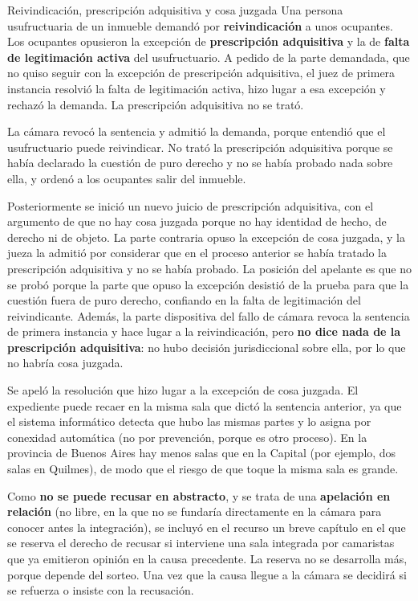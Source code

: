 \documentclass[12pt,oneside]{book}
\begin{document}
\begin{example}{Reivindicación, prescripción adquisitiva y cosa juzgada}
Una persona usufructuaria de un inmueble demandó por \textbf{reivindicación} a unos ocupantes. Los ocupantes opusieron la excepción de \textbf{prescripción adquisitiva} y la de \textbf{falta de legitimación activa} del usufructuario. A pedido de la parte demandada, que no quiso seguir con la excepción de prescripción adquisitiva, el juez de primera instancia resolvió la falta de legitimación activa, hizo lugar a esa excepción y rechazó la demanda. La prescripción adquisitiva no se trató.

La cámara revocó la sentencia y admitió la demanda, porque entendió que el usufructuario puede reivindicar. No trató la prescripción adquisitiva porque se había declarado la cuestión de puro derecho y no se había probado nada sobre ella, y ordenó a los ocupantes salir del inmueble.

Posteriormente se inició un nuevo juicio de prescripción adquisitiva, con el argumento de que no hay cosa juzgada porque no hay identidad de hecho, de derecho ni de objeto. La parte contraria opuso la excepción de cosa juzgada, y la jueza la admitió por considerar que en el proceso anterior se había tratado la prescripción adquisitiva y no se había probado. La posición del apelante es que no se probó porque la parte que opuso la excepción desistió de la prueba para que la cuestión fuera de puro derecho, confiando en la falta de legitimación del reivindicante. Además, la parte dispositiva del fallo de cámara revoca la sentencia de primera instancia y hace lugar a la reivindicación, pero \textbf{no dice nada de la prescripción adquisitiva}: no hubo decisión jurisdiccional sobre ella, por lo que no habría cosa juzgada.
\end{example}

Se apeló la resolución que hizo lugar a la excepción de cosa juzgada. El expediente puede recaer en la misma sala que dictó la sentencia anterior, ya que el sistema informático detecta que hubo las mismas partes y lo asigna por conexidad automática (no por prevención, porque es otro proceso). En la provincia de Buenos Aires hay menos salas que en la Capital (por ejemplo, dos salas en Quilmes), de modo que el riesgo de que toque la misma sala es grande.

Como \textbf{no se puede recusar en abstracto}, y se trata de una \textbf{apelación en relación} (no libre, en la que no se fundaría directamente en la cámara para conocer antes la integración), se incluyó en el recurso un breve capítulo en el que se reserva el derecho de recusar si interviene una sala integrada por camaristas que ya emitieron opinión en la causa precedente. La reserva no se desarrolla más, porque depende del sorteo. Una vez que la causa llegue a la cámara se decidirá si se refuerza o insiste con la recusación.
\end{document}
